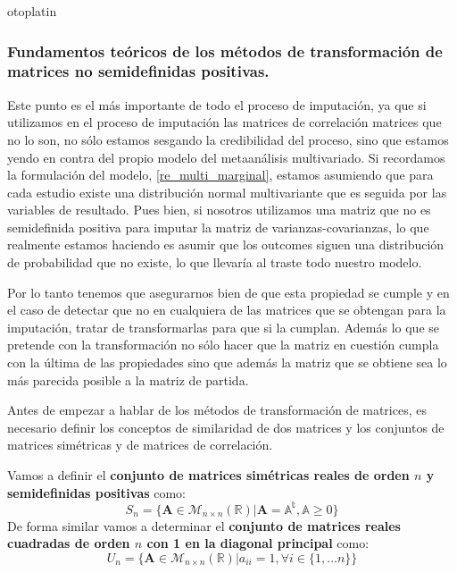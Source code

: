 otoplatin\documentclass[a4paper,openright,12pt]{report}
\begin{document}
\subsubsection{Fundamentos teóricos de los métodos de transformación de matrices no semidefinidas positivas.}
Este punto es el más importante de todo el proceso de imputación, ya que si utilizamos en el proceso de imputación las matrices de correlación matrices que no lo son, no sólo estamos sesgando la credibilidad del proceso, sino que estamos yendo en contra del propio modelo del metaanálisis multivariado. Si recordamos la formulación del modelo, \ref{re_multi_marginal}, estamos asumiendo que para cada estudio existe una distribución normal multivariante que es seguida por las variables de resultado. Pues bien, si nosotros utilizamos una matriz que no es semidefinida positiva para imputar la matriz de varianzas-covarianzas, lo que realmente estamos haciendo es asumir que los outcomes siguen una distribución de probabilidad que no existe, lo que llevaría al traste todo nuestro modelo.

Por lo tanto tenemos que asegurarnos bien de que esta propiedad se cumple y en el caso de detectar que no en cualquiera de las matrices que se obtengan para la imputación, tratar de transformarlas para que si la cumplan. Además lo que se pretende con la transformación no sólo hacer que la matriz en cuestión cumpla con la última de las propiedades sino que además la matriz que se obtiene sea lo más parecida posible a la matriz de partida.

Antes de empezar a hablar de los métodos de transformación de matrices, es necesario definir los conceptos de similaridad de dos matrices y los conjuntos de matrices simétricas y de matrices de correlación.

Vamos a definir el \textbf{conjunto de matrices simétricas reales de orden $n$ y semidefinidas positivas} como:
\begin{equation}
S_{n}=\lbrace \mathbf{A}\in \mathcal{M}_{n\times n}(\mathbb{R}) \vert \mathbf{A}=\mathbb{A^{t}}, \mathbb{A}\geq 0\rbrace
\label{S_n}
\end{equation}
De forma similar vamos a determinar el \textbf{conjunto de matrices reales cuadradas de orden $n$ con 1 en la diagonal principal} como: 
\begin{equation}
U_{n}=\lbrace \mathbf{A}\in \mathcal{M}_{n\times n}(\mathbb{R}) \vert a_{ii}=1, \forall i \in \lbrace 1,\ldots n\rbrace \rbrace
\label{U_n}
\end{equation}
\end{document}
